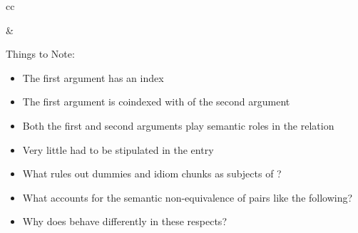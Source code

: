 \documentclass[a4paper,landscape,headrule,footrule]{foils}
\begin{document}
\begin{tabular}[t]{cc}
\begin{minipage}{0.5\linewidth}
  \footnotesize
  \end{minipage}
  &
\begin{minipage}{0.4\linewidth}
\small
Things to Note:
\begin{itemize}
\item The first argument has an index
\item The first argument is coindexed with  of the second argument
\item Both the first and  second arguments play 
semantic roles in the  relation
\item Very little had to be stipulated in the entry 
\end{itemize}
\end{minipage}
\end{tabular}

\begin{itemize}
\item What rules out dummies and idiom chunks as 
subjects of ?
\item What accounts for the semantic non-equivalence of 
pairs like the following?
\begin{xlisti}
  \ex {}
  \ex {}
\end{xlisti}
\item Why does  behave differently in these 
respects?
\end{itemize}
\end{document}
